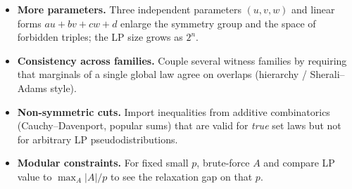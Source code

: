 \documentclass[11pt]{article}
\begin{document}
\begin{itemize}
\item \textbf{More parameters.} Three independent parameters $(u,v,w)$ and
linear forms $a u+b v+c w+d$ enlarge the symmetry group and the space of
forbidden triples; the LP size grows as $2^n$.
\item \textbf{Consistency across families.} Couple several witness families by
requiring that marginals of a single global law agree on overlaps (hierarchy /
Sherali--Adams style).
\item \textbf{Non-symmetric cuts.} Import inequalities from additive combinatorics
(Cauchy--Davenport, popular sums) that are valid for \emph{true} set laws but not
for arbitrary LP pseudodistributions.
\item \textbf{Modular constraints.} For fixed small $p$, brute-force $A$ and
compare LP value to $\max_A |A|/p$ to see the relaxation gap on that $p$.
\end{itemize}
\end{document}

